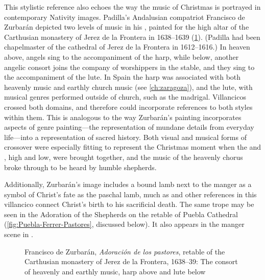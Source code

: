 This stylistic reference also echoes the way the music of Christmas is portrayed
in contemporary Nativity images.
Padilla's Andalusian compatriot Francisco de Zurbarán depicted two levels of
music in his , painted for the high altar of
the Carthusian monastery of Jerez de la Frontera in 1638--1639
(\cref{fig:Zurbaran-Jerez-Adoracion}).
(Padilla had been chapelmaster of the cathedral of Jerez de la Frontera in
1612--1616.)%
    \Autocite{Gembero:Padilla}
In heaven above, angels sing to the accompaniment of the harp, while below,
another angelic consort joins the company of worshippers in the stable, and they
sing to the accompaniment of the lute.
In Spain the harp was associated with both heavenly music and earthly church
music (see \cref{ch:zaragoza}), and the lute, with musical genres
performed outside of church, such as the madrigal.
Villancicos crossed both domains, and therefore could incorporate references to
both styles within them.
This is analogous to the way Zurbarán's painting incorporates aspects of genre
painting---the representation of mundane details from everyday life---into a
representation of sacred history.%
    \Autocites[31]{Sanchez:Zurbaran}{Cherry:Bodegon}{Haraszti-Takacs:Genre}
Both visual and musical forms of crossover were especially fitting to represent
the Christmas moment when the  and , high and low,
were brought together, and the music of the heavenly chorus broke through to be
heard by humble shepherds.%
\begin{Footnote}
    Additionally, Zurbarán's image includes a bound lamb next to the manger as a
    symbol of Christ's fate as the paschal lamb, much as  and other references in this villancico connect Christ's birth
    to his sacrificial death.
    The same trope may be seen in the Adoration of the Shepherds on the retable
    of Puebla Cathedral (\cref{fig:Puebla-Ferrer-Pastores}, discussed below).
    It also appears in the manger scene in
    \autocite[168]{Catholic:Breviarium1631}.
\end{Footnote}

\begin{figure}
    \caption{Francisco de Zurbarán, \emph{Adoración de los pastores}, retable of
    the Carthusian monastery of Jerez de la Frontera, 1638--39: The consort of
    heavenly and earthly music, harp above and lute below}

    \label{fig:Zurbaran-Jerez-Adoracion}
\end{figure}

